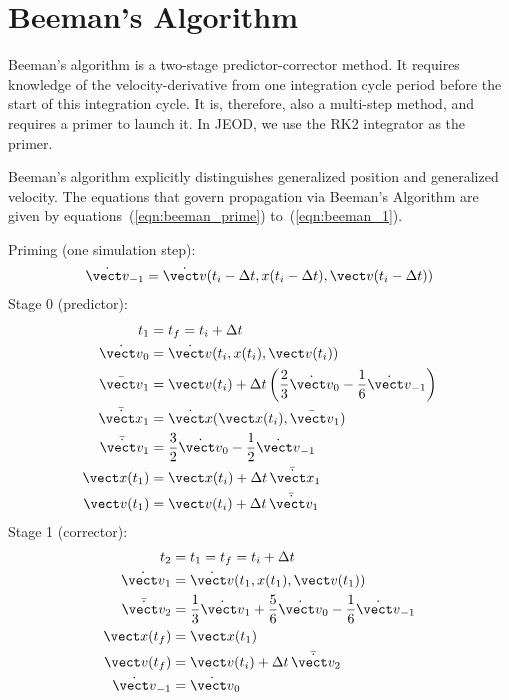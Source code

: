 \chapter{Beeman's Algorithm}\label{app:beeman}

Beeman's algorithm is a two-stage predictor-corrector method.  It requires
knowledge of the velocity-derivative from one integration cycle period before
the start of this integration cycle.  It is, therefore, also a multi-step
method, and requires a primer to launch it.  In JEOD, we use the RK2
integrator as the primer.

Beeman's algorithm explicitly distinguishes generalized position and
generalized velocity. The equations that govern propagation via Beeman's
Algorithm are given by equations~(\ref{eqn:beeman_prime})
to~(\ref{eqn:beeman_1})\cite{beeman:1976}.

Priming (one simulation step):
\begin{equation}
\label{eqn:beeman_prime}
\begin{split}
\dot{\vect v}_{-1} &=
  \dot{\vect v}(t_i-\Delta t, x(t_i-\Delta t),\vect v(t_i-\Delta t)) \\
\end{split}
\end{equation}
Stage 0 (predictor):
\begin{equation}
\label{eqn:beeman_0}
\begin{split}
t_1 &= t_f = t_i + \Delta t \\
\dot{\vect v}_{0} &=
  \dot{\vect v}(t_i, x(t_i),\vect v(t_i)) \\
\bar{\vect v}_1 &= \vect v(t_i) +
   \Delta t
   \left(\frac 2 3 \dot{\vect v}_{0} - \frac 1 6 \dot{\vect v}_{-1}\right) \\
\bar{\dot{\vect x}}_1 &= \dot {\vect x}(\vect x(t_i),\bar{\vect v}_1) \\
\bar{\dot{\vect v}}_1 &=
  \frac 3 2 \dot{\vect v}_{0} - \frac 1 2 \dot{\vect v}_{-1} \\
\vect x(t_1) &= \vect x(t_i) + \Delta t \, \bar{\dot{\vect x}}_1 \\
\vect v(t_1) &= \vect v(t_i) + \Delta t \, \bar{\dot{\vect v}}_1
\end{split}
\end{equation}
Stage 1 (corrector):
\begin{equation}
\label{eqn:beeman_1}
\begin{split}
t_2 &= t_1 = t_f = t_i + \Delta t \\
\dot{\vect v}_{1} &=
  \dot{\vect v}(t_1, x(t_1),\vect v(t_1)) \\
\bar{\dot{\vect v}}_2 &=
  \frac 1 3 \dot{\vect v}_{1} +
  \frac 5 6 \dot{\vect v}_{0} - \frac 1 6 \dot{\vect v}_{-1} \\
\vect x(t_f) &= \vect x(t_1) \\
\vect v(t_f) &= \vect v(t_i) + \Delta t \, \bar{\dot{\vect v}}_2 \\
\dot{\vect v}_{-1} &= \dot{\vect v}_{0}
\end{split}
\end{equation}


